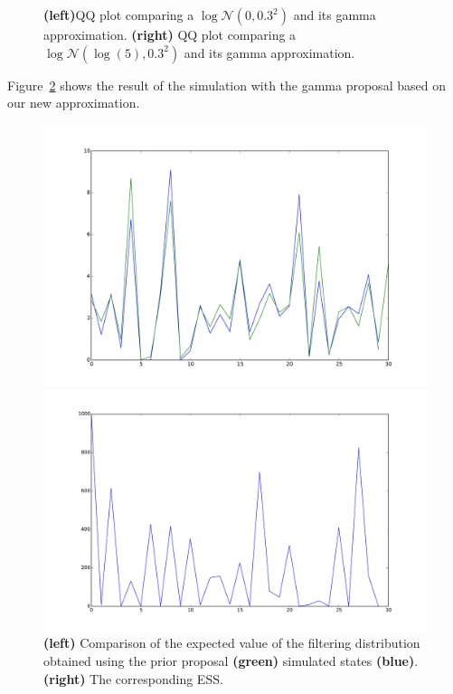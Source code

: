 \documentclass{article}
\begin{document}
\begin{figure}[htb]
\begin{minipage}{.45\textwidth}
	\end{minipage}
	\caption{\textbf{(left)}QQ plot comparing a $\log\mathcal{N}(0, 0.3^2)$ and its gamma approximation. \textbf{(right)} QQ plot comparing a $\log\mathcal{N}(\log(5), 0.3^2)$ and its gamma approximation.}
	\label{fig:approx2}
\end{figure}
 \clearpage
Figure~\ref{fig:gamma2} shows the result of the simulation with the gamma proposal based on our new approximation.

\begin{figure}[htb]
	\centering
	\begin{minipage}{.45\textwidth}
		\centering
		\includegraphics[width=0.97\linewidth]{bootstrap-filter/diagno_gamma2.pdf}
	\end{minipage}
	\begin{minipage}{.45\textwidth}
		\centering
		\includegraphics[width=0.97\linewidth]{bootstrap-filter/ESS_gamma2.pdf}
	\end{minipage}
	\caption{\textbf{(left)} Comparison of the expected value of the filtering distribution obtained using the prior proposal \textbf{(green)} simulated states \textbf{(blue)}. \textbf{(right)} The corresponding ESS. }
	\label{fig:gamma2}
\end{figure}
\end{document}
